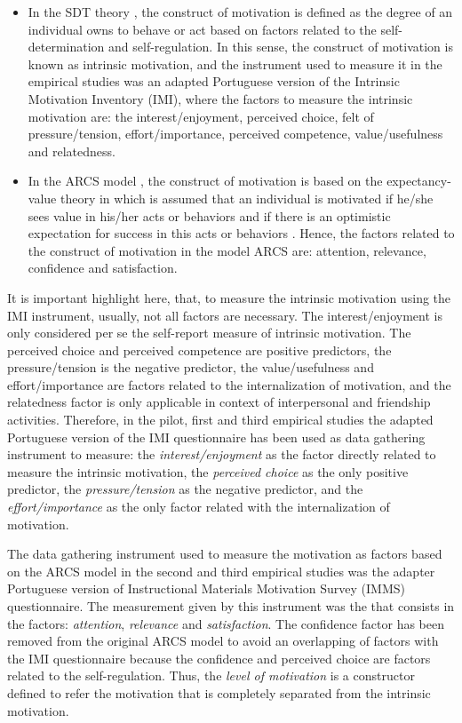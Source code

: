 \begin{itemize}
\item
In the SDT theory \cite{RyanDeci2000}, the construct of motivation is defined as the degree of an individual owns to behave or act based on factors related to the self-determination and self-regulation. In this sense, the construct of motivation is known as intrinsic motivation, and the instrument used to measure it in the empirical studies was an adapted Portuguese version of the Intrinsic Motivation Inventory (IMI), where the factors to measure the intrinsic motivation are: the interest/enjoyment, perceived choice, felt of pressure/tension, effort/importance, perceived competence, value/usefulness and relatedness.

\item
In the ARCS model \cite{Keller2009}, the construct of motivation is based on the expectancy-value theory in which is assumed that an individual is motivated if he/she sees value in his/her acts or behaviors and if there is an optimistic expectation for success in this acts or behaviors \cite{Wigfield1994}. Hence, the factors related to the construct of motivation in the model ARCS are: attention, relevance, confidence and satisfaction.
\end{itemize}

It is important highlight here, that, to measure the intrinsic motivation using the IMI instrument, usually, not all factors are necessary. The interest/enjoyment is only considered per se the self-report measure of intrinsic motivation. The perceived choice and perceived competence are positive predictors, the pressure/tension is the negative predictor, the value/usefulness and effort/importance are factors related to the internalization of motivation, and the relatedness factor is only applicable in context of interpersonal and friendship activities. Therefore, in the pilot, first and third empirical studies the adapted Portuguese version of the IMI questionnaire has been used as data gathering instrument to measure: the \emph{interest/enjoyment} as the factor directly related to measure the intrinsic motivation, the \emph{perceived choice} as the only positive predictor, the \emph{pressure/tension} as the negative predictor, and the \emph{effort/importance} as the only factor related with the internalization of motivation.

The data gathering instrument used to measure the motivation as factors based on the ARCS model in the second and third empirical studies was the adapter Portuguese version of Instructional Materials Motivation Survey (IMMS) questionnaire. The measurement given by this instrument was the  that consists in the factors: \emph{attention}, \emph{relevance} and \emph{satisfaction}. The confidence factor has been removed from the original ARCS model to avoid an overlapping of factors with the IMI questionnaire because the confidence and perceived choice are factors related to the self-regulation. Thus, the \emph{level of motivation} is a constructor defined to refer the motivation that is completely separated from the intrinsic motivation.

